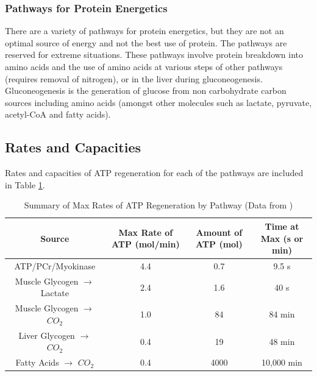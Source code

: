\subsubsection{Pathways for Protein Energetics}

There are a variety of pathways for protein energetics, but they are not an optimal source of energy and not the best use of protein. The pathways are reserved for extreme situations. These pathways involve protein breakdown into amino acids and the use of amino acids at various steps of other pathways (requires removal of nitrogen), or in the liver during gluconeogenesis. Gluconeogenesis is the generation of glucose from non carbohydrate carbon sources including amino acids (amongst other molecules such as lactate, pyruvate, acetyl-CoA and fatty acids).


\subsection{Rates and Capacities}

Rates and capacities of ATP regeneration for each of the pathways are included in Table \ref{table:ATP_Rates}.

\begin{table}[h!]
\centering
\begin{tabular}{||c c c c||} 
 \hline
Source & Max Rate of ATP (mol/min) & Amount of ATP (mol) & Time at Max (s or min)\\ [0.5ex] 
 \hline\hline
 ATP/PCr/Myokinase & 4.4  & 0.7 & 9.5 s \\
 Muscle Glycogen $\rightarrow$ Lactate &  2.4 & 1.6 & 40 s \\ 
 Muscle Glycogen $\rightarrow$ $CO_2$ & 1.0 & 84 & 84 min\\
 Liver Glycogen $\rightarrow$ $CO_2$  & 0.4 & 19 & 48 min \\ 
 Fatty Acids $\rightarrow$ $CO_2$ & 0.4 & 4000 & 10,000 min \\[1ex] 
 \hline
\end{tabular}
\caption{Summary of Max Rates of ATP Regeneration by Pathway (\footnotesize{Data from \cite{feher_quantitative_2017}})}
\label{table:ATP_Rates}
\end{table}

